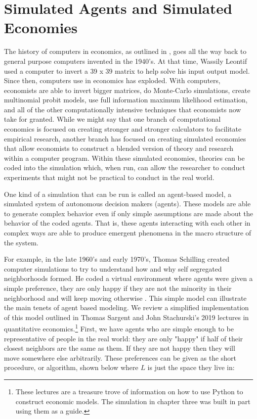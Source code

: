 \documentclass[12pt,twoside]{reedthesis}
\begin{document}
	
\section{Simulated Agents and Simulated Economies}
The history of computers in economics, as outlined in \citet{Backhouse2016}, goes all the way back to general purpose computers invented in the 1940's. At that time, Wassily Leontif used a computer to invert a 39 x 39 matrix to help solve his input output model. Since then, computers use in economics has exploded. With computers, economists are able to invert bigger matrices, do Monte-Carlo simulations, create multinomial probit models, use full information maximum likelihood estimation, and all of the other computationally intensive techniques that economists now take for granted. While we might say that one branch of computational economics is focused on creating stronger and stronger calculators to facilitate empirical research, another branch has focused on creating simulated economies that allow economists to construct a blended version of theory and research within a computer program. Within these simulated economies, theories can be coded into the simulation which, when run, can allow the researcher to conduct experiments that might not be practical to conduct in the real world. 

One kind of a simulation that can be run is called an agent-based model, a simulated system of autonomous decision makers (agents). These models are able to generate complex behavior even if only simple assumptions are made about the behavior of the coded agents. That is, these agents interacting with each other in complex ways are able to produce emergent phenomena in the macro structure of the system.

For example, in the late 1960's and early 1970's, Thomas Schilling created computer simulations to try to understand how and why self segregated neighborhoods formed. He coded a virtual environment where agents were given a simple preference, they are only happy if they are not the minority in their neighborhood and will keep moving otherwise \citep{Schelling1969}. This simple model can illustrate the main tenets of agent based modeling. We review a simplified implementation of this model outlined in Thomas Sargent and John Stachurski's 2019 lectures in quantitative economics.\footnote{These lectures are a treasure trove of information on how to use Python to construct economic models. The simulation in chapter three was built in part using them as a guide.} First, we have agents who are simple enough to be representative of people in the real world: they are only "happy" if half of their closest neighbors are the same as them. If they are not happy then they will move somewhere else arbitrarily. These preferences can be given as the short procedure, or algorithm, shown below where $L$ is just the space they live in:
\end{document}
